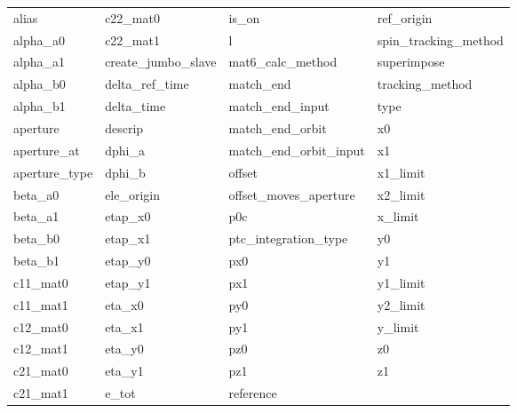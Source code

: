  \begin{tabular}{llll} \toprule
alias                       & c22_mat0                    & is_on                       & ref_origin                  \\
alpha_a0                    & c22_mat1                    & l                           & spin_tracking_method        \\
alpha_a1                    & create_jumbo_slave          & mat6_calc_method            & superimpose                 \\
alpha_b0                    & delta_ref_time              & match_end                   & tracking_method             \\
alpha_b1                    & delta_time                  & match_end_input             & type                        \\
aperture                    & descrip                     & match_end_orbit             & x0                          \\
aperture_at                 & dphi_a                      & match_end_orbit_input       & x1                          \\
aperture_type               & dphi_b                      & offset                      & x1_limit                    \\
beta_a0                     & ele_origin                  & offset_moves_aperture       & x2_limit                    \\
beta_a1                     & etap_x0                     & p0c                         & x_limit                     \\
beta_b0                     & etap_x1                     & ptc_integration_type        & y0                          \\
beta_b1                     & etap_y0                     & px0                         & y1                          \\
c11_mat0                    & etap_y1                     & px1                         & y1_limit                    \\
c11_mat1                    & eta_x0                      & py0                         & y2_limit                    \\
c12_mat0                    & eta_x1                      & py1                         & y_limit                     \\
c12_mat1                    & eta_y0                      & pz0                         & z0                          \\
c21_mat0                    & eta_y1                      & pz1                         & z1                          \\
c21_mat1                    & e_tot                       & reference                   &                             \\
 \bottomrule
 \end{tabular}
 \vfill
 
